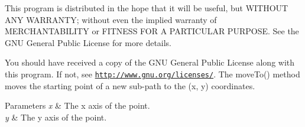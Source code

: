 This program is distributed in the hope that it will be useful, but W\+I\+T\+H\+O\+U\+T A\+N\+Y W\+A\+R\+R\+A\+N\+T\+Y; without even the implied warranty of M\+E\+R\+C\+H\+A\+N\+T\+A\+B\+I\+L\+I\+T\+Y or F\+I\+T\+N\+E\+S\+S F\+O\+R A P\+A\+R\+T\+I\+C\+U\+L\+A\+R P\+U\+R\+P\+O\+S\+E. See the G\+N\+U General Public License for more details.

You should have received a copy of the G\+N\+U General Public License along with this program. If not, see \href{http://www.gnu.org/licenses/}{\tt http\+://www.\+gnu.\+org/licenses/}. The move\+To() method moves the starting point of a new sub-\/path to the (x, y) coordinates. 
\begin{DoxyParams}{Parameters}
{\em x} & The x axis of the point. \\
\hline
{\em y} & The y axis of the point. \\
\hline
\end{DoxyParams}
